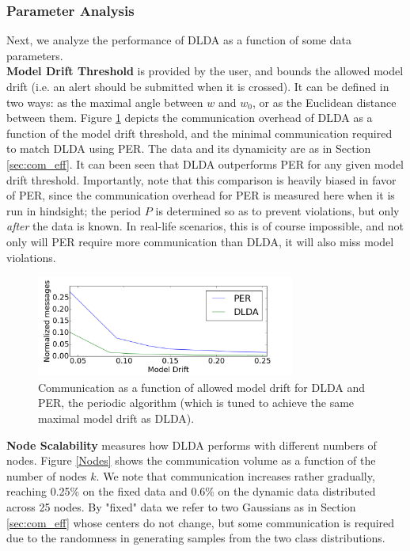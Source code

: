 \subsubsection{Parameter Analysis}\label{sec:paramanal}
Next, we analyze the performance of DLDA as a function of some data parameters.
~~\\
\noindent\textbf{Model Drift Threshold}  is provided by the user, and bounds
the allowed model drift (i.e. an alert should be submitted when it is crossed).
It can be defined in two ways: as the maximal angle between 
$w$ and $w_0$, or as the Euclidean distance between them. 
Figure \ref{PERvsDLDAoverError} depicts the communication overhead of DLDA 
as a function of the model drift threshold, and the minimal communication required to match 
DLDA using PER.	The data and its dynamicity are as in Section \ref{sec:com_eff}.
It can been seen that  DLDA outperforms PER for
any given model drift threshold. Importantly, note that this comparison is
heavily biased in favor of PER, since the communication overhead for
PER is measured here when it is run in hindsight; the period $P$ is determined so as to
prevent violations, but only \textit{after} the data is known. In real-life
scenarios, this is of course impossible, and not only will PER require 
more communication than DLDA, it will also miss model violations.
%
\begin{figure}
        \centering
        \includegraphics[width=85mm]{graphics/onlyDrift.png}
        \caption{Communication as a function of allowed model drift for DLDA and PER, the
        periodic algorithm (which is tuned to achieve the same maximal model drift as DLDA).}
        \label{PERvsDLDAoverError}
\end{figure}
%

\noindent\textbf{Node Scalability}
measures how DLDA performs with different numbers of nodes.
Figure \ref{Nodes} shows the communication volume as a function of the number of nodes $k$.
We note that communication increases rather gradually, reaching 0.25\% on the fixed
data and 0.6\% on the dynamic data distributed across 25 nodes. By "fixed" data we
refer to two Gaussians as in Section \ref{sec:com_eff} whose centers do not change,
but some communication is required due to the randomness in generating
samples from the two class distributions. 

